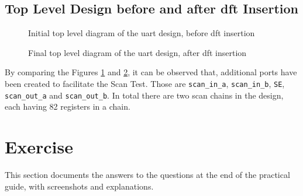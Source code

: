 \documentclass[a4paper,11pt]{article}%
\begin{document}
\pagebreak
\subsection{Top Level Design before and after \ac{dft} Insertion}

\begin{figure}[h]
	\centering
	\caption{Initial top level diagram of the \ac{uart} design,  before \ac{dft} insertion}
	\label{fig:init_top_level}
\end{figure}

\begin{figure}[h]
	\centering
	\caption{Final top level diagram of the \ac{uart} design, after \ac{dft} insertion}
	\label{fig:final_top_level}
\end{figure}

By comparing the Figures \ref{fig:init_top_level} and \ref{fig:final_top_level}, it can be observed that, additional ports have been created to facilitate the Scan Test. Those are {\tt scan\_in\_a}, {\tt scan\_in\_b}, {\tt SE}, {\tt scan\_out\_a} and {\tt scan\_out\_b}. In total there are two scan chains in the design, each having 82 registers in a chain.

\pagebreak
\section{Exercise}
This section documents the answers to the questions at the end of the practical guide, with screenshots and explanations.\\
\end{document}
